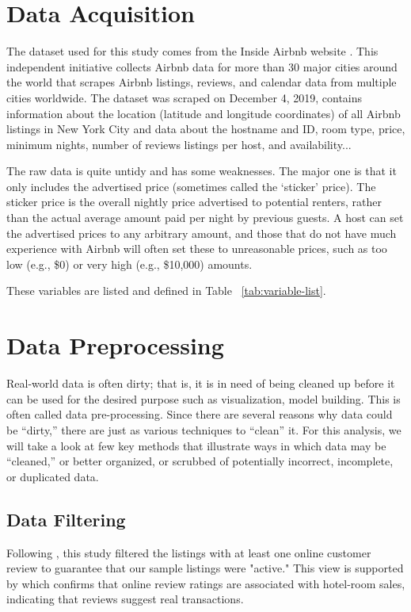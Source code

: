 \section{Data Acquisition}
\label{sec:data_acquisition}

The dataset used for this study comes from the Inside Airbnb website
\textcite{Airbnb}. This independent initiative collects Airbnb data for more than 30
major cities around the world that scrapes Airbnb listings, reviews, and
calendar data from multiple cities worldwide. The dataset  was scraped on
December 4, 2019, contains information about the location (latitude and
longitude coordinates) of all Airbnb listings in New York City and data about
the hostname and ID, room type, price, minimum nights, number of reviews
listings per host, and availability...

The raw data is quite untidy and has some weaknesses. The major one is that it
only includes the advertised price (sometimes called the ‘sticker’ price). The
sticker price is the overall nightly price advertised to potential renters,
rather than the actual average amount paid per night by previous guests. A host
can set the advertised prices to any arbitrary amount, and those that do not
have much experience with Airbnb will often set these to unreasonable prices,
such as too low (e.g., \$0) or very high (e.g., \$10,000) amounts.

These variables are listed and defined in Table ~\ref{tab:variable-list}.

\section{Data Preprocessing }
\label{sec:data_cleaning}

Real-world data is often dirty; that is, it is in need of being cleaned up
before it can be used for the desired purpose such as visualization, model
building. This is often called data pre-processing.
Since there are several reasons why data could be “dirty,” there are just as
various techniques to “clean” it.  For this analysis, we will take a look at
few key methods that illustrate ways in which data may be “cleaned,” or better
organized, or scrubbed of potentially incorrect, incomplete, or duplicated data.

\subsection{Data Filtering}

Following \textcite{wang2017price}, this study filtered the listings with at
least one online customer review to guarantee that our sample listings were
"active." This view is supported by \textcite{ye2009impact}  which confirms that online
review ratings are associated with hotel-room sales, indicating that reviews
suggest real transactions.

